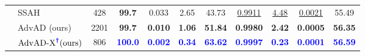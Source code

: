 \documentclass{article}
\begin{document}
\begin{table}[t]
{\begin{tabular}{clccccccccc}
                                    & SSAH \cite{luo2022frequency}          & 428       & \textbf{99.7}      & 0.033     & 2.65      & 43.73     & \underline{0.9911}    & \underline{4.48}      & \underline{0.0021}    & 55.49 \\
        \cmidrule(lr){2-11}
                                    & AdvAD (ours)        & 2201      & \textbf{99.7}      & \textbf{0.010}     & \textbf{1.06}      & \textbf{51.84}     & \textbf{0.9980}    & \textbf{2.42}      & \textbf{0.0005}    & \textbf{56.35} \\
                                    & $\text{AdvAD-X}^{\textcolor{blue}{\boldsymbol{\dag}}} \text{(ours)}$ & 806     & \textcolor{blue}{\textbf{100.0}}     & \textcolor{blue}{\textbf{0.002}}     & \textcolor{blue}{\textbf{0.34}}      & \textcolor{blue}{\textbf{63.62}}     & \textcolor{blue}{\textbf{0.9997}}    & \textcolor{blue}{\textbf{0.23}}      & \textcolor{blue}{\textbf{0.0001}}    & \textcolor{blue}{\textbf{56.59}} \\


\end{tabular}}
\end{table}
\end{document}
